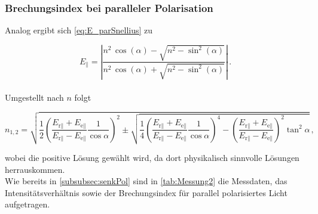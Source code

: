 \subsubsection{Brechungsindex bei paralleler Polarisation}

Analog ergibt sich \eqref{eq:E_parSnellius} zu

\begin{equation*}
    E_\parallel = \left| \frac{n^2 \, \cos(\alpha) - \sqrt{n^2 - \sin^2(\alpha)}}{n^2 \, \cos(\alpha) + \sqrt{n^2 - \sin^2(\alpha)}} \right| \,.
\end{equation*} \\

Umgestellt nach $n$ folgt

\begin{equation*}
    n_{1,2} = \sqrt{ \frac{1}{2} \left(  \frac{E_{\text{r}\parallel} + E_{\text{e}\parallel}}{E_{\text{r}\parallel} - E_{\text{e}\parallel}} \frac{1}{\cos{\alpha}}\right)^2         \pm \sqrt { \frac{1}{4} \left(  \frac{E_{\text{r}\parallel} + E_{\text{e}\parallel}}{E_{\text{r}\parallel} - E_{\text{e}\parallel}} \frac{1}{\cos{\alpha}}\right)^4         - \left( \frac{E_{\text{r}\parallel} + E_{\text{e}\parallel}}{E_{\text{r}\parallel} - E_{\text{e}\parallel}} \right)^2 \tan^2{\alpha} }    } \, ,
\end{equation*}

wobei die positive Lösung gewählt wird, da dort physikalisch sinnvolle Lösungen herrauskommen.\\

Wie bereits in \autoref{subsubsec:senkPol} sind in \autoref{tab:Messung2} die Messdaten, das Intensitätsverhältnis sowie der Brechungsindex für parallel polarisiertes Licht aufgetragen.

